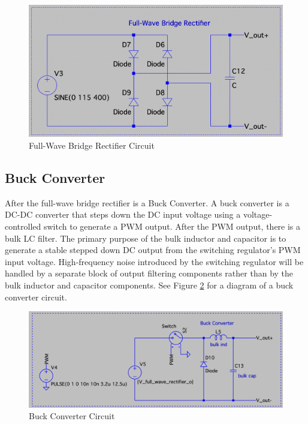 \documentclass[conference]{IEEEtran}
\begin{document}
\begin{figure}[htp]
    \centering
    \includegraphics[width=1.0\linewidth]{full-wave_bridge_rectifier_circuit.png}
    \caption{Full-Wave Bridge Rectifier Circuit}
    \label{fig:full-wave_bridge_rectifier_circuit_diagram}
\end{figure}

\subsection{Buck Converter}
After the full-wave bridge rectifier is a Buck Converter. A buck converter is a DC-DC converter that steps down the DC input voltage using a voltage-controlled switch to generate a PWM output. After the PWM output, there is a bulk LC filter. The primary purpose of the bulk inductor and capacitor is to generate a stable stepped down DC output from the switching regulator's PWM input voltage. High-frequency noise introduced by the switching regulator will be handled by a separate block of output filtering components rather than by the bulk inductor and capacitor components. See Figure \ref{fig:buck_converter_circuit_diagram} for a diagram of a buck converter circuit.

\begin{figure}[htp]
    \centering
    \includegraphics[width=1.0\linewidth]{buck_converter_circuit.png}
    \caption{Buck Converter Circuit}
    \label{fig:buck_converter_circuit_diagram}
\end{figure}
\end{document}
